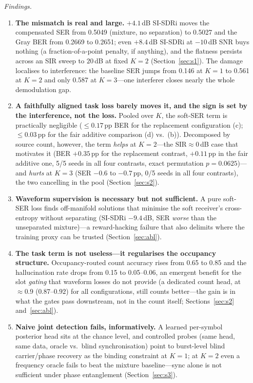 \documentclass[review,12pt]{elsarticle}
\newcommand{\sir}{\mathrm{SIR}}
\begin{document}
\emph{Findings.}
\begin{enumerate}
  \item \textbf{The mismatch is real and large.} $+4.1$\,dB SI-SDRi
        moves the compensated SER from 0.5049 (mixture, no separation)
        to 0.5027 and the Gray BER from 0.2669 to 0.2651; even
        $+8.4$\,dB SI-SDRi at $-10$\,dB SNR buys nothing (a
        fraction-of-a-point penalty, if anything), and the flatness
        persists across an SIR sweep to $20$\,dB at fixed $K{=}2$
        (Section~\ref{sec:s1}). The damage localises to interference:
        the baseline SER jumps from 0.146 at $K{=}1$ to 0.561 at
        $K{=}2$ and only 0.587 at $K{=}3$---one interferer closes
        nearly the whole demodulation gap.
  \item \textbf{A faithfully aligned task loss barely moves it, and
        the sign is set by the interference, not the loss.} Pooled
        over $K$, the soft-SER term is practically negligible
        ($\leq 0.17$\,pp BER for the replacement configuration (c);
        $\leq 0.03$\,pp for the fair additive comparison (d) vs.\ (b)).
        Decomposed by source count, however, the term \emph{helps} at
        $K{=}2$---the $\sir \approx 0$\,dB case that motivates it
        (BER $+0.35$\,pp for the replacement contrast, $+0.11$\,pp in
        the fair additive one, 5/5 seeds in all four contrasts, exact
        permutation $p = 0.0625$)---and \emph{hurts} at $K{=}3$ (SER
        $-0.6$ to $-0.7$\,pp, 0/5 seeds in all four contrasts), the two
        cancelling in the pool (Section~\ref{sec:s2}).
  \item \textbf{Waveform supervision is necessary but not sufficient.}
        A pure soft-SER loss finds off-manifold solutions that minimise
        the soft receiver's cross-entropy without separating
        (SI-SDRi $-9.4$\,dB, SER \emph{worse} than the unseparated
        mixture)---a reward-hacking failure that also delimits where the
        training proxy can be trusted (Section~\ref{sec:abl}).
  \item \textbf{The task term is not useless---it regularises the
        occupancy structure.} Occupancy-routed count accuracy rises from
        0.65 to 0.85 and the hallucination rate drops from 0.15 to
        0.05--0.06,
        an emergent benefit for the slot \emph{gating} that waveform
        losses do not provide (a dedicated count head, at $\approx$0.9
        ($0.87$--$0.92$) for
        all configurations, still counts better---the gain is in what
        the gates pass downstream, not in the count itself;
        Sections~\ref{sec:s2} and~\ref{sec:abl}).
  \item \textbf{Naive joint detection fails, informatively.} A learned
        per-symbol posterior head sits at the chance level, and
        controlled probes (same head, same data, oracle vs.\ blind
        synchronisation) point to burst-level blind carrier/phase
        recovery as the binding constraint at $K{=}1$; at $K{=}2$ even
        a frequency oracle fails to beat the mixture baseline---sync
        alone is not sufficient under phase entanglement
        (Section~\ref{sec:s3}).
\end{enumerate}
\end{document}
